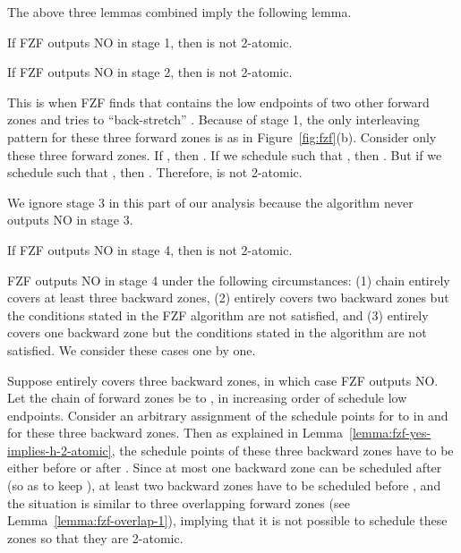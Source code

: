 {The above three lemmas combined imply the following lemma.

\begin{lemma}
  \label{lemma:fzf-no-1}
  If FZF outputs NO in stage 1, then  is not 2-atomic.
\end{lemma}

\begin{lemma}
  \label{lemma:fzf-no-2}
  If FZF outputs NO in stage 2, then  is not 2-atomic.
\end{lemma}

\proof This is when FZF finds that  contains the low endpoints
of two other forward zones and tries to ``back-stretch'' .
Because of stage 1, the only interleaving pattern for these three
forward zones is as  in Figure~\ref{fig:fzf}(b).
Consider only these three forward zones.  If ,
then .  If we schedule  such that
, then .  But if we schedule
 such that , then .
Therefore,  is not 2-atomic.  \QED

We ignore stage 3 in this part of our analysis because the algorithm
never outputs NO in stage 3.

\begin{lemma}
  \label{lemma:fzf-no-3}
  If FZF outputs NO in stage 4, then  is not 2-atomic.
\end{lemma}

\proof FZF outputs NO in stage 4 under the following circumstances:
(1) chain  entirely covers at least three backward zones, (2) 
entirely covers two backward zones but the conditions stated in the
FZF algorithm are not satisfied, and (3)  entirely covers one
backward zone but the conditions stated in the algorithm are not
satisfied.  We consider these cases one by one.

Suppose  entirely covers three backward zones, in which case FZF
outputs NO.  Let the chain of forward zones be  to , in
increasing order of schedule low endpoints.  Consider an arbitrary
assignment of the schedule points for  to  in  and
for these three backward zones.  Then as explained in
Lemma~\ref{lemma:fzf-yes-implies-h-2-atomic}, the schedule points of
these three backward zones have to be either before  or after
.  Since at most one backward zone can be scheduled after 
(so as to keep ), at least two backward zones
have to be scheduled before , and the situation is similar to
three overlapping forward zones (see Lemma~\ref{lemma:fzf-overlap-1}),
implying that it is not possible to schedule these zones so that they
are 2-atomic.

}
